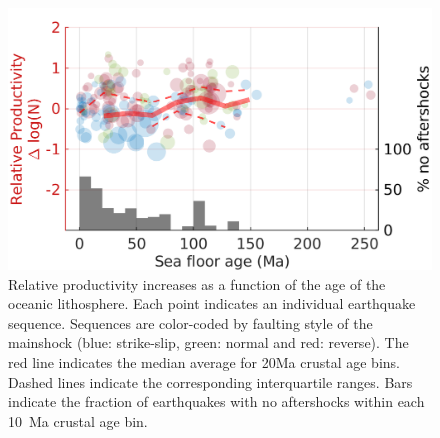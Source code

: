 \documentclass[draft]{agujournal}
\begin{document}
\begin{figure}[H]
\centering
\includegraphics{figures/prod_vs_age_mw5.png}
\caption{Relative productivity increases as a function of the age of the oceanic lithosphere. Each point indicates an individual earthquake sequence. Sequences are color-coded by faulting style of the mainshock (blue: strike-slip, green: normal and red: reverse). The red line indicates the median average for 20Ma crustal age bins. Dashed lines indicate the corresponding interquartile ranges. Bars indicate the fraction of earthquakes with no aftershocks within each 10~Ma crustal age bin.}
\label{fig:prod_vs_age}
\end{figure}   
\end{document}

